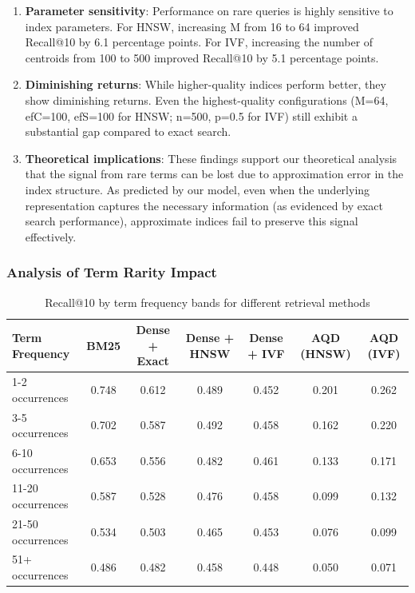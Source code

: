 \documentclass[sigconf,review]{acmart}
\begin{document}
\begin{enumerate}
    \item \textbf{Parameter sensitivity}: Performance on rare queries is highly sensitive to index parameters. For HNSW, increasing M from 16 to 64 improved Recall@10 by 6.1 percentage points. For IVF, increasing the number of centroids from 100 to 500 improved Recall@10 by 5.1 percentage points.
    
    \item \textbf{Diminishing returns}: While higher-quality indices perform better, they show diminishing returns. Even the highest-quality configurations (M=64, efC=100, efS=100 for HNSW; n=500, p=0.5 for IVF) still exhibit a substantial gap compared to exact search.
    
    \item \textbf{Theoretical implications}: These findings support our theoretical analysis that the signal from rare terms can be lost due to approximation error in the index structure. As predicted by our model, even when the underlying representation captures the necessary information (as evidenced by exact search performance), approximate indices fail to preserve this signal effectively.
\end{enumerate}

\subsubsection{Analysis of Term Rarity Impact}

\begin{table}[t]
\caption{Recall@10 by term frequency bands for different retrieval methods}
\label{tab:term_frequency}
\centering
\begin{tabular}{lcccccc}
\toprule
Term Frequency & BM25 & Dense + Exact & Dense + HNSW & Dense + IVF & AQD (HNSW) & AQD (IVF) \\
\midrule
1-2 occurrences & 0.748 & 0.612 & 0.489 & 0.452 & 0.201 & 0.262 \\
3-5 occurrences & 0.702 & 0.587 & 0.492 & 0.458 & 0.162 & 0.220 \\
6-10 occurrences & 0.653 & 0.556 & 0.482 & 0.461 & 0.133 & 0.171 \\
11-20 occurrences & 0.587 & 0.528 & 0.476 & 0.458 & 0.099 & 0.132 \\
21-50 occurrences & 0.534 & 0.503 & 0.465 & 0.453 & 0.076 & 0.099 \\
51+ occurrences & 0.486 & 0.482 & 0.458 & 0.448 & 0.050 & 0.071 \\
\bottomrule
\end{tabular}
\end{table}
\end{document}
